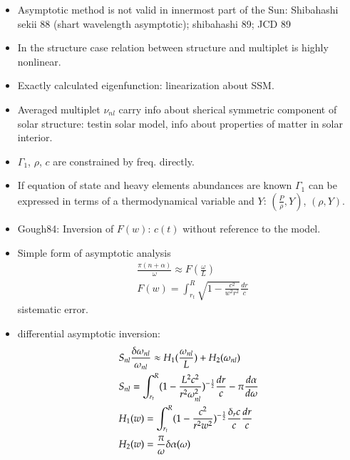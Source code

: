 \documentclass[../main.tex]{subfiles}
\begin{document}
\begin{itemize}
    \item Asymptotic method is not valid in innermost part of the Sun: Shibahashi sekii 88 (shart wavelength asymptotic); shibahashi 89; JCD 89 
    
    \item In the structure case relation between structure and multiplet is highly nonlinear.
    \item Exactly calculated eigenfunction: linearization about SSM.
    \item Averaged  multiplet $\nu_{nl}$ carry info about sherical symmetric component of solar structure: testin solar model, info about properties of matter in solar interior.
    \item $\Gamma_1$, $\rho$, $c$ are constrained by freq. directly.
    \item If equation of state and heavy elements abundances are known $\Gamma_1$ can be expressed in terms of a thermodynamical variable and $Y$: $(\frac{P}{\rho},Y)$, $(\rho,Y)$.
    
    \item Gough84:  Inversion of $F(w)$: $c(t)$ without reference to the model.
    
    \item Simple form of asymptotic analysis
    \begin{align*}
    &\frac{\pi(n+\alpha)}{\omega}\approx F(\frac{\omega}{L})\\
    &F(w)=\int_{r_t}^R\sqrt{1-\frac{c^2}{w^2r^2}}\frac{dr}{c}
    \end{align*}
    sistematic error.
    \item differential asymptotic inversion:
    \begin{align*}
    &S_{nl}\frac{\delta\omega_{nl}}{\omega_{nl}}\approx H_1(\frac{\omega_{nl}}{L})+H_2(\omega_{nl})\\
    &S_{nl}=\int_{r_t}^R(1-\frac{L^2c^2}{r^2\omega_{nl}^2})^{-\frac{1}{2}}\frac{dr}{c}-\pi\frac{d \alpha}{d \omega}\\
    &H_1(w)=\int_{r_t}^R(1-\frac{c^2}{r^2w^2})^{-\frac{1}{2}}\frac{\delta_rc}{c}\frac{dr}{c}\\
    &H_2(w)=\frac{\pi}{\omega}\delta\alpha(\omega)
    \end{align*}

\begin{comment}    
    \begin{figure}[!ht]
    \centering
    \texttt{[image: freqdiff\_13]}
    \caption{Frequency difference.}
    \end{figure}
\end{comment}


\end{itemize}
\end{document}
